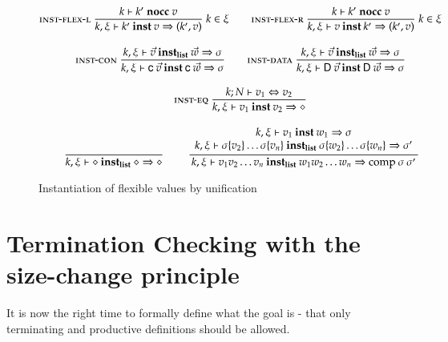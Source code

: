 \begin{figure}
\begin{gather*}
\mbox{\sc inst-flex-l}\ \dfrac{k\vdash k'\mbox{ \textbf{nocc} }v}{k,\xi\vdash k'\:\mathbf{inst}\:v\Rightarrow (k',v)}
{\; k \in \xi }
\qquad
\mbox{\sc inst-flex-r}\ \dfrac{k\vdash k'\mbox{ \textbf{nocc} }v}{k,\xi\vdash v\:\mathbf{inst}\:k'\Rightarrow (k',v)}
{\; k \in \xi}
\\[2ex]
\mbox{\sc inst-con}\ \dfrac{{k,\xi\vdash\vec{v}\:\mathbf{inst_{list}}\:\vec{w}\Rightarrow \sigma}}{k,\xi\vdash\mathsf{c} \: \vec{v}\:\mathbf{inst}\:\mathsf{c} \: \vec{w}\Rightarrow \sigma
}
\qquad
\mbox{\sc inst-data}\ \dfrac{{k,\xi\vdash\vec{v}\:\mathbf{inst_{list}}\:\vec{w}\Rightarrow \sigma}}{k,\xi\vdash\mathsf{D} \: \vec{v}\:\mathbf{inst}\:\mathsf{D} \: \vec{w}\Rightarrow \sigma
}
\\[2ex]
\mbox{\sc inst-eq}\ \dfrac{k;N\vdash v_1\Leftrightarrow v_2}{k,\xi\vdash v_1\:\mathbf{inst}\:v_2\Rightarrow \diamond
}
\\[2ex]
\ \dfrac{}{k,\xi\vdash\diamond\:\mathbf{inst_{list}}\:\diamond\Rightarrow \diamond}
\qquad
\ \dfrac{\begin{array}[b]{c}k,\xi\vdash v_1\:\mathbf{inst}\:w_1\Rightarrow \sigma\\k,\xi\vdash\sigma\{v_2\} \ldots \sigma\{v_n\}\:\mathbf{inst_{list}}\:\sigma\{w_2\} \ldots \sigma\{w_n\}\Rightarrow \sigma'\end{array}}{k,\xi\vdash v_1 v_2 \ldots v_n\:\mathbf{inst_{list}}\:w_1 w_2 \ldots w_n\Rightarrow \mathrm{comp}\:\sigma\:\sigma'}
\end{gather*}
\caption{Instantiation of flexible values by unification}
\end{figure}

\chapter{Termination Checking with the size-change principle}

It is now the right time to formally define what the goal is - that only terminating and productive definitions should be allowed.
